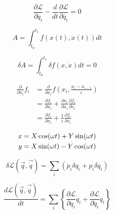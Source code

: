 $$
\frac{\partial \mathcal{L}}{\partial q_i} - \frac{d}{dt}\frac{\partial \mathcal{L}}{\partial \dot{q_i}} = 0
$$


$$ A = \int_{t_0}^{t_1} f(x(t), \dot{x}(t)) dt $$

$$
\delta A = \int_{t_0}^{t_1} \delta f(x, \dot{x})dt = 0
$$

\begin{align*}
    \frac{\partial}{\partial x_i} f_i &=
    \frac{\partial}{\partial x_i} f \left(x_i, \frac{x_i - x_{i-1}}{\varepsilon}\right) \\
    &= \frac{\partial f_i}{\partial x_i} + \frac{\partial v_i}{\partial x_i} \frac{\partial f_i}{\partial v_i} \\
    &= \frac{\partial f_i}{\partial x_i} + \frac{1}{\varepsilon} \frac{\partial f_i}{\partial v_i}
\end{align*}

\begin{align}
    x &= X \cos(\omega t) + Y \sin(\omega t) \notag \\
    y &= X \sin(\omega t) - Y \cos(\omega t) \label{eq:rotation}
\end{align}

$$
\delta \mathcal{L}(\vec{q}, \vec{\dot{q}}) = \sum_i \left( \dot{p}_i \delta q_i
+ p_i \delta \dot{q}_i \right)
$$

\begin{equation}
    \frac{d \mathcal{L}(\vec{q}, \vec{\dot{q}})}{dt} = \sum_i \left\{ \frac{\partial \mathcal{L}}{\partial q_i} \dot{q}_i
    + \frac{\partial \mathcal{L}}{\partial \dot{q}_i} \ddot{q}_i \right\} \label{eq:tsym}
\end{equation}
